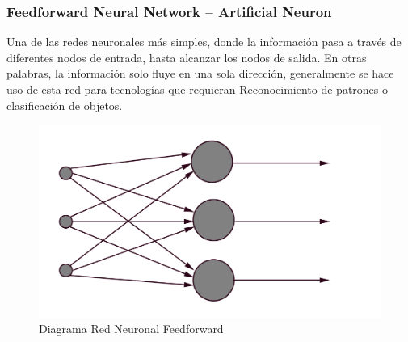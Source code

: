 \documentclass[12pt, a4paper, titlepage]{report}
\begin{document}
        	    \subsubsection{Feedforward Neural Network – Artificial Neuron}
				Una de las redes neuronales más simples, donde la información pasa a través de diferentes nodos de entrada, hasta alcanzar los nodos de salida. En otras palabras, la información solo fluye en una sola dirección, generalmente se hace uso de esta red para tecnologías que requieran \Gls{Reconocimiento} de patrones o clasificación de objetos.\cite{refTiposRedesNeu3}\par
				\begin{figure}[H]
					\includegraphics[width=12cm]{./imagenes/MarcoTeorico/RedesN/Feedforward.png}
					\centering 
					\caption{Diagrama Red Neuronal Feedforward}
				\end{figure}
\end{document}
